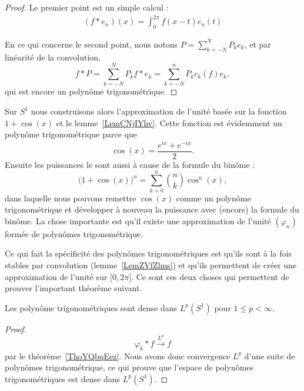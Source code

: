 \begin{proof}
    Le premier point est un simple calcul :
    \begin{subequations}
        \begin{align}
            (f*e_n)(x)=\int_0^{2\pi}f(x-t)e_n(t)
        \end{align}
    \end{subequations}

    En ce qui concerne le second point, nous notons \( P=\sum_{k=-N}^NP_ke_k\), et par linéarité de la convolution,
    \begin{equation}
        f*P=\sum_{k=-N}^NP_kf*e_k=\sum_{k=-N}^nP_kc_k(f)e_k,
    \end{equation}
    qui est encore un polynôme trigonométrique.
\end{proof}

\begin{example} \label{ExDMnVSWF}
    Sur \( S^1\) nous construisons alors l'approximation de l'unité basée sur la fonction \( 1+\cos(x)\) et le lemme~\ref{LemCNjIYhv}. Cette fonction est évidemment un polynôme trigonométrique parce que
    \begin{equation}
        \cos(x)=\frac{  e^{ix}+ e^{-ix} }{2}.
    \end{equation}
    Ensuite les puissances le sont aussi à cause de la formule du binôme :
    \begin{equation}
        \big( 1+\cos(x) \big)^n=\sum_{k=0}^n\binom{ n }{ k }\cos^n(x),
    \end{equation}
    dans laquelle nous pouvons remettre \( \cos(x)\) comme un polynôme trigonométrique et développer à nouveau la puissance avec (encore) la formule du binôme. La chose importante est qu'il existe une approximation de l'unité \( (\varphi_n)\) formée de polynômes trigonométrique.

    Ce qui fait la spécificité des polynômes trigonométriques est qu'ils sont à la fois stables par convolution (lemme~\ref{LemZVfZlms}) et qu'ils permettent de créer une approximation de l'unité sur \( \mathopen[ 0 , 2\pi \mathclose]\). Ce sont ces deux choses qui permettent de prouver l'important théorème suivant.
\end{example}

\begin{theorem} \label{ThoQGPSSJq}
    Les polynôme trigonométriques sont dense dans \( L^p(S^1)\) pour \( 1\leq p<\infty\).
\end{theorem}

\begin{proof}
    
    \begin{equation}
        \varphi_k*f\stackrel{L^p}{\to}f
    \end{equation}
    par le théorème~\ref{ThoYQbqEez}. Nous avons donc convergence \( L^p\) d'une suite de polynômes trigonométrique, ce qui prouve que l'espace de polynômes trigonométriques est dense dans \( L^p(S^1)\).
\end{proof}

